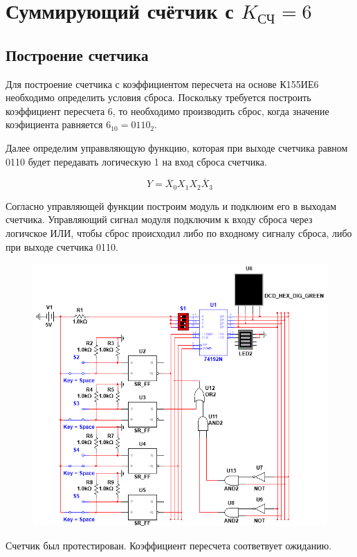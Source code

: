 \section*{Суммирующий счётчик с $K_{\text{СЧ}} = 6$}

\subsection*{Построение счетчика}

Для построение счетчика с коэффициентом пересчета на основе К155ИЕ6 необходимо определить условия сброса.
Поскольку требуется построить коэффициент пересчета 6, то необходимо производить сброс, когда
значение коэфициента равняется $6_{10}=0110_2$. \par

Далее определим управвляющую функцию, которая при выходе счетчика равном 0110 будет передавать логическую 
1 на вход сброса счетчика.

$$
    Y=\overline{X}_0X_1X_2\overline{X}_3
$$

Согласно управляющей функции построим модуль и подклюим его в выходам счетчика. Управляющий сигнал модуля 
подключим к входу сброса через логичское ИЛИ, чтобы сброс происходил либо по входному сигналу сброса, либо при
выходе счетчика 0110.

\begin{figure}[h!]
    \centering
    \includegraphics[scale=0.8]{images/image-13.png}
    \label{image:13}
\end{figure}

Счетчик был протестирован. Коэффициент пересчета соответвует ожиданию.
